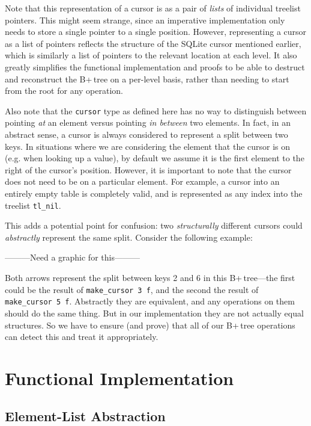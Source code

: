 \documentclass[a4paper,12pt]{article}
\begin{document}
Note that this representation of a cursor is as a pair of \textit{lists} of individual treelist pointers. This might seem strange, since an imperative implementation only needs to store a single pointer to a single position. However, representing a cursor as a list of pointers reflects the structure of the SQLite cursor mentioned earlier, which is similarly a list of pointers to the relevant location at each level. It also greatly simplifies the functional implementation and proofs to be able to destruct and reconstruct the B+\,tree on a per-level basis, rather than needing to start from the root for any operation.

Also note that the \texttt{cursor} type as defined here has no way to distinguish between pointing \textit{at} an element versus pointing \textit{in between} two elements. In fact, in an abstract sense, a cursor is always considered to represent a split between two keys. In situations where we are considering the element that the cursor is on (e.g. when looking up a value), by default we assume it is the first element to the right of the cursor’s position. However, it is important to note that the cursor does not need to be on a particular element. For example, a cursor into an entirely empty table is completely valid, and is represented as any index into the treelist \texttt{tl\_nil}.

This adds a potential point for confusion: two \textit{structurally} different cursors could \textit{abstractly} represent the same split. Consider the following example:

---------Need a graphic for this---------

Both arrows represent the split between keys 2 and 6 in this B+\,tree---the first could be the result of \texttt{make\_cursor 3 f}, and the second the result of \texttt{make\_cursor 5 f}. Abstractly they are equivalent, and any operations on them should do the same thing. But in our implementation they are not actually equal structures. So we have to ensure (and prove) that all of our B+\,tree operations can detect this and treat it appropriately.

\clearpage

\section{Functional Implementation} \label{sec:func}

\subsection{Element-List Abstraction}
\end{document}
